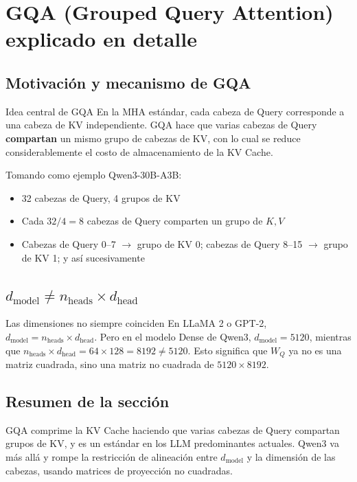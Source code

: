 \section{GQA (Grouped Query Attention) explicado en detalle}

\subsection{Motivación y mecanismo de GQA}

\begin{importantbox}{Idea central de GQA}
En la MHA estándar, cada cabeza de Query corresponde a una cabeza de KV independiente. GQA hace que varias cabezas de Query \textbf{compartan} un mismo grupo de cabezas de KV, con lo cual se reduce considerablemente el costo de almacenamiento de la KV Cache.
\end{importantbox}

Tomando como ejemplo Qwen3-30B-A3B:
\begin{itemize}
  \item 32 cabezas de Query, 4 grupos de KV
  \item Cada $32 / 4 = 8$ cabezas de Query comparten un grupo de $K, V$
  \item Cabezas de Query 0--7 $\to$ grupo de KV 0; cabezas de Query 8--15 $\to$ grupo de KV 1; y así sucesivamente
\end{itemize}

\subsection{$d_{\text{model}} \neq n_{\text{heads}} \times d_{\text{head}}$}

\begin{warningbox}{Las dimensiones no siempre coinciden}
En LLaMA 2 o GPT-2, $d_{\text{model}} = n_{\text{heads}} \times d_{\text{head}}$. Pero en el modelo Dense de Qwen3, $d_{\text{model}} = 5120$, mientras que $n_{\text{heads}} \times d_{\text{head}} = 64 \times 128 = 8192 \neq 5120$. Esto significa que $W_Q$ ya no es una matriz cuadrada, sino una matriz no cuadrada de $5120 \times 8192$.
\end{warningbox}

\subsection{Resumen de la sección}

GQA comprime la KV Cache haciendo que varias cabezas de Query compartan grupos de KV, y es un estándar en los LLM predominantes actuales. Qwen3 va más allá y rompe la restricción de alineación entre $d_{\text{model}}$ y la dimensión de las cabezas, usando matrices de proyección no cuadradas.

